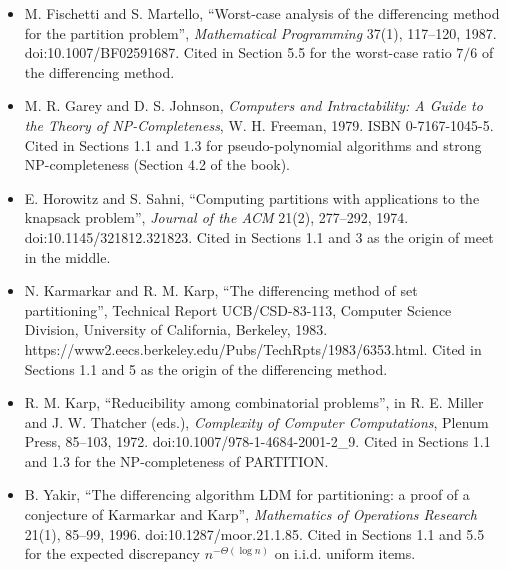 \documentclass[
]{article}
\providecommand{\tightlist}{%
  \setlength{\itemsep}{0pt}\setlength{\parskip}{0pt}}
\begin{document}
\begin{itemize}
\tightlist
\item
  M. Fischetti and S. Martello, ``Worst-case analysis of the
  differencing method for the partition problem'', \emph{Mathematical
  Programming} 37(1), 117--120, 1987. doi:10.1007/BF02591687. Cited in
  Section 5.5 for the worst-case ratio \(7/6\) of the differencing
  method.
\item
  M. R. Garey and D. S. Johnson, \emph{Computers and Intractability: A
  Guide to the Theory of NP-Completeness}, W. H. Freeman, 1979. ISBN
  0-7167-1045-5. Cited in Sections 1.1 and 1.3 for pseudo-polynomial
  algorithms and strong NP-completeness (Section 4.2 of the book).
\item
  E. Horowitz and S. Sahni, ``Computing partitions with applications to
  the knapsack problem'', \emph{Journal of the ACM} 21(2), 277--292,
  1974. doi:10.1145/321812.321823. Cited in Sections 1.1 and 3 as the
  origin of meet in the middle.
\item
  N. Karmarkar and R. M. Karp, ``The differencing method of set
  partitioning'', Technical Report UCB/CSD-83-113, Computer Science
  Division, University of California, Berkeley, 1983.
  https://www2.eecs.berkeley.edu/Pubs/TechRpts/1983/6353.html. Cited in
  Sections 1.1 and 5 as the origin of the differencing method.
\item
  R. M. Karp, ``Reducibility among combinatorial problems'', in R. E.
  Miller and J. W. Thatcher (eds.), \emph{Complexity of Computer
  Computations}, Plenum Press, 85--103, 1972.
  doi:10.1007/978-1-4684-2001-2\_9. Cited in Sections 1.1 and 1.3 for
  the NP-completeness of PARTITION.
\item
  B. Yakir, ``The differencing algorithm LDM for partitioning: a proof
  of a conjecture of Karmarkar and Karp'', \emph{Mathematics of
  Operations Research} 21(1), 85--99, 1996. doi:10.1287/moor.21.1.85.
  Cited in Sections 1.1 and 5.5 for the expected discrepancy
  \(n^{-\Theta(\log n)}\) on i.i.d. uniform items.
\end{itemize}
\end{document}
